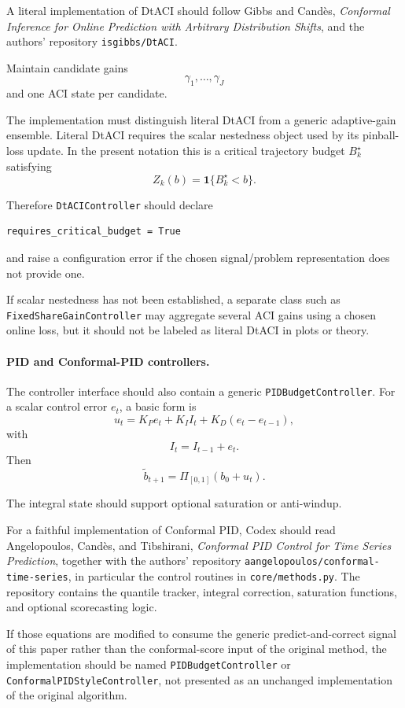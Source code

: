 \documentclass[11pt]{article}
\begin{document}
A literal implementation of DtACI should follow Gibbs and Cand\`es,
\emph{Conformal Inference for Online Prediction with Arbitrary Distribution
Shifts}, and the authors' repository
\texttt{isgibbs/DtACI}.

Maintain candidate gains
\[
    \gamma_1,\ldots,\gamma_J
\]
and one ACI state per candidate.

The implementation must distinguish literal DtACI from a generic
adaptive-gain ensemble.  Literal DtACI requires the scalar nestedness object
used by its pinball-loss update.  In the present notation this is a critical
trajectory budget $B_k^\star$ satisfying
\[
    Z_k(b)
    =
    \mathbf 1\{
        B_k^\star<b
    \}.
\]

Therefore \texttt{DtACIController} should declare
\begin{verbatim}
requires_critical_budget = True
\end{verbatim}
and raise a configuration error if the chosen signal/problem representation
does not provide one.

If scalar nestedness has not been established, a separate class such as
\texttt{FixedShareGainController} may aggregate several ACI gains using a
chosen online loss, but it should not be labeled as literal DtACI in plots or
theory.

\paragraph{PID and Conformal-PID controllers.}

The controller interface should also contain a generic
\texttt{PIDBudgetController}.  For a scalar control error $e_t$, a basic form
is
\[
    u_t
    =
    K_P e_t
    +
    K_I I_t
    +
    K_D(e_t-e_{t-1}),
\]
with
\[
    I_t
    =
    I_{t-1}+e_t.
\]
Then
\[
    \widetilde b_{t+1}
    =
    \Pi_{[0,1]}
    (
        b_0+u_t
    ).
\]

The integral state should support optional saturation or anti-windup.

For a faithful implementation of Conformal PID, Codex should read
Angelopoulos, Cand\`es, and Tibshirani,
\emph{Conformal PID Control for Time Series Prediction}, together with the
authors' repository
\texttt{aangelopoulos/conformal-time-series}, in particular the control
routines in \texttt{core/methods.py}.  The repository contains the quantile
tracker, integral correction, saturation functions, and optional scorecasting
logic.

If those equations are modified to consume the generic predict-and-correct
signal of this paper rather than the conformal-score input of the original
method, the implementation should be named
\texttt{PIDBudgetController} or
\texttt{ConformalPIDStyleController}, not presented as an unchanged
implementation of the original algorithm.
\end{document}
